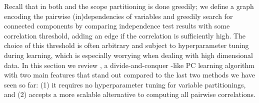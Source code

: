 Recall that in both  and  the scope partitioning is done
greedily; we define a graph encoding the pairwise (in)dependencies of variables and greedily search
for connected components by comparing independence test results with some correlation threshold,
adding an edge if the correlation is sufficiently high. The choice of this threshold is often
arbitrary and subject to hyperparameter tuning during learning, which is especially worrying when
dealing with high dimensional data. In this section we review 
\citep{jaini18a}, a divide-and-conquer -like PC learning algorithm with two main
features that stand out compared to the last two methods we have seen so far: (1) it requires no
hyperparameter tuning for variable partitionings, and (2) accepts a more scalable alternative to
computing all pairwise correlations.

